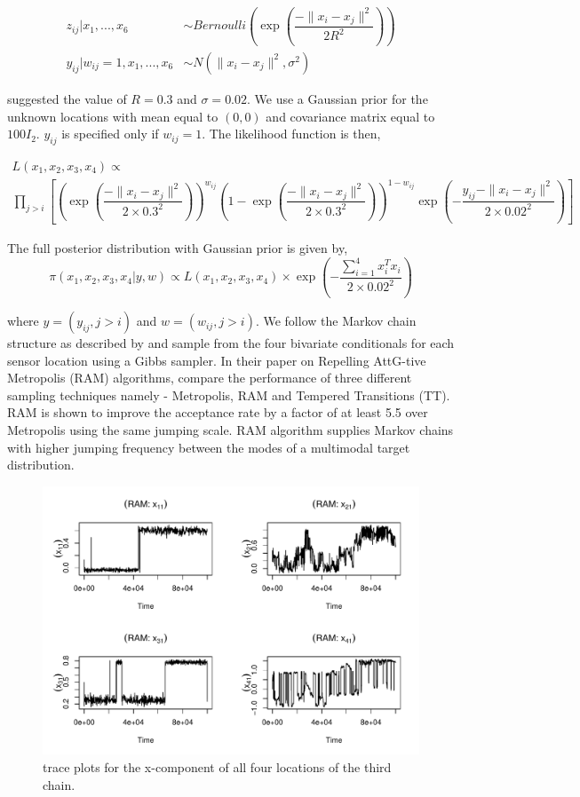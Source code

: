 \documentclass[11pt]{article}
\theoremstyle{remark}
\begin{document}
\begin{align*}
    z_{ij}|x_1, ..., x_6 &\sim Bernoulli\left(\exp\left(\dfrac{-\|x_i - x_j\|^2}{2R^2}\right)\right)\\
    y_{ij}| w_{ij} = 1, x_1, ..., x_6 &\sim N(\|x_i - x_j\|^2, \sigma^2)
\end{align*}

\cite{ahn2013distributed} suggested the value of $R = 0.3$ and $\sigma = 0.02$. We use a Gaussian prior for the unknown locations with  mean equal to $(0,0)$ and covariance matrix equal to $100 I_2$. $y_{ij}$ is specified only if $w_{ij} = 1$. The likelihood function is then,

\begin{multline*}
    L(x_1, x_2, x_3, x_4) \propto \\
\prod_{j>i} \left[ \left(\exp\left(\dfrac{-\|x_i - x_j\|^2}{2 \times 0.3^2}\right)\right)^{w_{ij}} \left(1 - \exp\left(\dfrac{-\|x_i - x_j\|^2}{2 \times 0.3^2}\right)\right)^{1 - w_{ij}} \exp \left(-\dfrac{y_{ij} - \|x_i - x_j\|^2}{2 \times 0.02^2}\right)\right]    
\end{multline*}

The full posterior distribution with Gaussian prior is given by,
\begin{equation} \label{ex:sensor_post}
    \pi (x_1, x_2, x_3, x_4 | y, w) \propto 
    L(x_1, x_2, x_3, x_4) \times \exp \left(- \dfrac{\sum_{i = 1}^{4} x_i^Tx_i}{2 \times 0.02^2}\right) 
\end{equation}

where $y = (y_{ij}, j>i)$ and $w = (w_{ij}, j>i)$. We follow the Markov chain structure as described by \cite{tak2018repelling} and sample from the four bivariate conditionals for each sensor location using a Gibbs sampler. In their paper on Repelling AttG-tive Metropolis (RAM) algorithms, \cite{tak2018repelling} compare the performance of three different sampling techniques namely - Metropolis, RAM and Tempered Transitions (TT). RAM is shown to improve the acceptance rate by a factor of at least 5.5 over Metropolis using the same jumping scale. RAM algorithm supplies Markov chains with higher jumping frequency between the modes of a multimodal target distribution.\\

\begin{figure}[htbp]
    \centering
    \includegraphics[width = .7\textwidth]{plots/sensor-trace.pdf}
    \caption{trace plots for the x-component of all four locations of the third chain.}
    \label{fig:sensor-trace-3}
\end{figure}
\end{document}
